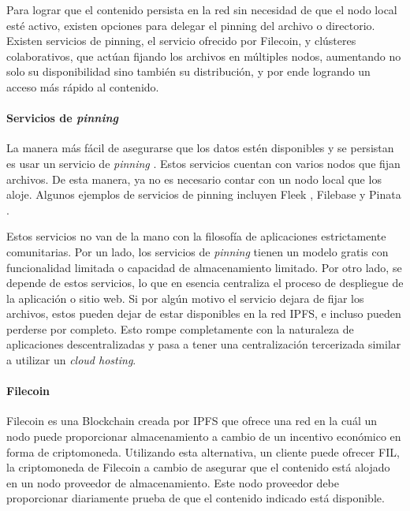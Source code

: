Para lograr que el contenido persista en la red sin necesidad de que el nodo local esté activo, existen opciones para delegar el pinning del archivo o directorio. Existen servicios de pinning, el servicio ofrecido por Filecoin, y clústeres colaborativos, que actúan fijando los archivos en múltiples nodos, aumentando no solo su disponibilidad sino también su distribución, y por ende logrando un acceso más rápido al contenido.

\paragraph{Servicios de \textit{pinning}}

La manera más fácil de asegurarse que los datos estén disponibles y se persistan es usar un servicio de \textit{pinning} \cite{pinning-services}. Estos servicios cuentan con varios nodos que fijan archivos. De esta manera, ya no es necesario contar con un nodo local que los aloje. Algunos ejemplos de servicios de pinning incluyen Fleek \cite{fleek}, Filebase\cite{filebase} y Pinata \cite{pinata}.

Estos servicios no van de la mano con la filosofía de aplicaciones estrictamente comunitarias. Por un lado, los servicios de \textit{pinning} tienen un modelo gratis con funcionalidad limitada o capacidad de almacenamiento limitado. Por otro lado, se depende de estos servicios, lo que en esencia centraliza el proceso de despliegue de la aplicación o sitio web. Si por algún motivo el servicio dejara de fijar los archivos, estos pueden dejar de estar disponibles en la red IPFS, e incluso pueden perderse por completo. Esto rompe completamente con la naturaleza de aplicaciones descentralizadas y pasa a tener una centralización tercerizada similar a utilizar un \textit{cloud hosting}.

\paragraph{Filecoin}

Filecoin \cite{filecoin} es una Blockchain creada por IPFS que ofrece una red en la cuál un nodo puede proporcionar almacenamiento a cambio de un incentivo económico en forma de criptomoneda. Utilizando esta alternativa, un cliente puede ofrecer FIL, la criptomoneda de Filecoin a cambio de asegurar que el contenido está alojado en un nodo proveedor de almacenamiento. Este nodo proveedor debe proporcionar diariamente prueba de que el contenido indicado está disponible.

